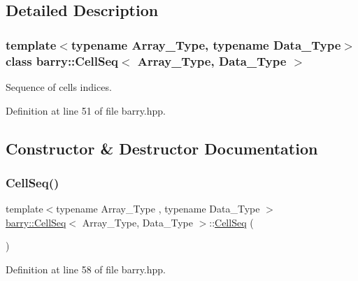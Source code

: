 \subsection{Detailed Description}
\subsubsection*{template$<$typename Array\+\_\+\+Type, typename Data\+\_\+\+Type$>$\newline
class barry\+::\+Cell\+Seq$<$ Array\+\_\+\+Type, Data\+\_\+\+Type $>$}

Sequence of cells indices. 



Definition at line 51 of file barry.\+hpp.



\subsection{Constructor \& Destructor Documentation}
\mbox{\label{classbarry_1_1_cell_seq_a7e9250af55622cdf1429d23e1052635c}} 
\subsubsection{\texorpdfstring{Cell\+Seq()}{CellSeq()}\hspace{0.1cm}{\footnotesize\ttfamily [1/2]}}
{\footnotesize\ttfamily template$<$typename Array\+\_\+\+Type , typename Data\+\_\+\+Type $>$ \\
\hyperlink{classbarry_1_1_cell_seq}{barry\+::\+Cell\+Seq}$<$ Array\+\_\+\+Type, Data\+\_\+\+Type $>$\+::\hyperlink{classbarry_1_1_cell_seq}{Cell\+Seq} (\begin{DoxyParamCaption}{ }\end{DoxyParamCaption})\hspace{0.3cm}{\ttfamily [inline]}}



Definition at line 58 of file barry.\+hpp.

\mbox{\label{classbarry_1_1_cell_seq_af7ea37359c8cd87e45394482b7e27b41}} 
